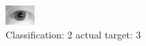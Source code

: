 \begin{figure}[h!]
\begin{center}
\includegraphics[width=0.60\columnwidth]{figures/ID1039_class_2_target_3.png}
\end{center}
\caption{ Classification: 2 actual target: 3}
\label{fig:ID1039_class_2_target_3}
\end{figure}
